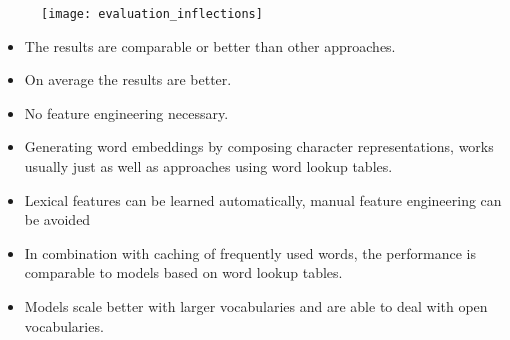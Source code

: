 \documentclass[11pt, a4paper, landscape]{article}
\begin{document}
\NewPage{}

\begin{figure}[H]
\begin{center}
  \texttt{[image: evaluation\_inflections]}
\end{center}
\end{figure}
\begin{itemize}
\item The results are comparable or better than other approaches.
\item On average the results are better.
\item No feature engineering necessary.
\end{itemize}


\NewPage{}

\vfill
\begin{itemize}
\item Generating word embeddings by composing character representations, works usually just as well
      as approaches using word lookup tables.
\item Lexical features can be learned automatically, manual feature engineering can be avoided
\item In combination with caching of frequently used words, the performance is comparable to models based on word lookup tables.
\item Models scale better with larger vocabularies and are able to deal with open vocabularies.
\end{itemize}
\vfill
\end{document}

